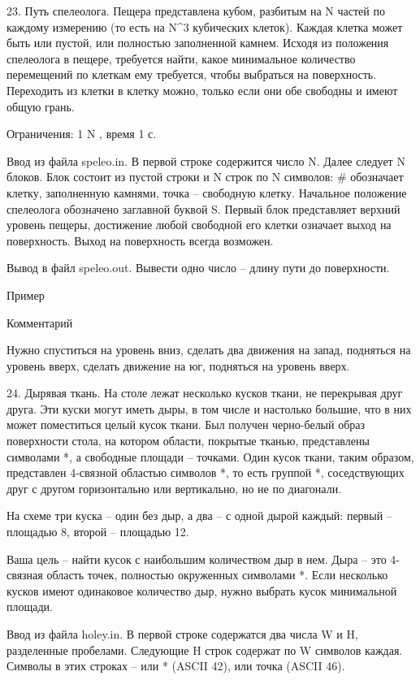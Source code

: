 \documentclass[]{article}
\begin{document}
23. Путь спелеолога. Пещера представлена кубом, разбитым на N частей по каждому измерению (то есть на N^3 кубических клеток). Каждая клетка может быть или пустой, или полностью заполненной камнем. Исходя из положения спелеолога в пещере, требуется найти, какое минимальное количество перемещений по клеткам ему требуется, чтобы выбраться на поверхность. Переходить из клетки в клетку можно, только если они обе свободны и имеют общую грань.

Ограничения: 1 \leq N , время 1 с.

Ввод из файла speleo.in. В первой строке содержится число N. Далее следует N блоков. Блок состоит из пустой строки и N строк по N символов: # обозначает клетку, заполненную камнями, точка – свободную клетку. Начальное положение спелеолога обозначено заглавной буквой S. Первый блок представляет верхний уровень пещеры, достижение любой свободной его клетки означает выход на поверхность. Выход на поверхность всегда возможен.

Вывод в файл speleo.out. Вывести одно число – длину пути до поверхности.

Пример



Комментарий

Нужно спуститься на уровень вниз, сделать два движения на запад, подняться на уровень вверх, сделать движение на юг, подняться на уровень вверх.

24. Дырявая ткань. На столе лежат несколько кусков ткани, не перекрывая друг друга. Эти куски могут иметь дыры, в том числе и настолько большие, что в них может поместиться целый кусок ткани. Был получен черно-белый образ поверхности стола, на котором области, покрытые тканью, представлены символами *, а свободные площади – точками. Один кусок ткани, таким образом, представлен 4-связной областью символов *, то есть группой *, соседствующих друг с другом горизонтально или вертикально, но не по диагонали.



На схеме три куска – один без дыр, а два – с одной дырой каждый: первый – площадью 8, второй – площадью 12.

Ваша цель – найти кусок с наибольшим количеством дыр в нем. Дыра – это 4-связная область точек, полностью окруженных символами *. Если несколько кусков имеют одинаковое количество дыр, нужно выбрать кусок минимальной площади.

Ввод из файла holey.in. В первой строке содержатся два числа W и H, разделенные пробелами. Следующие H строк содержат по W символов каждая. Символы в этих строках – или * (ASCII 42), или точка (ASCII 46).
\end{document}

